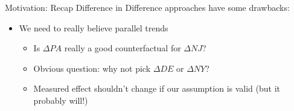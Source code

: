 \begin{frame}{Motivation: Recap}
Difference in Difference approaches have some drawbacks:
\begin{itemize}
\item We need to really believe \alert{parallel trends}
\begin{itemize}
\item Is $\Delta PA$ really a good counterfactual for  $\Delta NJ$?
\item Obvious question: why not pick $\Delta DE$ or $\Delta NY$?
\item Measured effect shouldn't change if our assumption is valid (but it probably will!)
\end{itemize}
\end{itemize}              
\end{frame}



